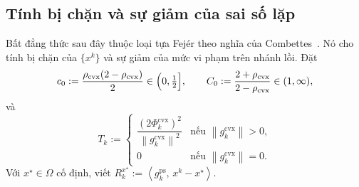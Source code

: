 \documentclass[]{interact}
\theoremstyle{plain}
\theoremstyle{definition}
\theoremstyle{remark}
\newcommand{\norm}[1]{\left\lVert #1 \right\rVert}
\newcommand{\inner}[2]{\left\langle #1,\, #2 \right\rangle}
\newcommand{\cvx}{\mathrm{cvx}}
\newcommand{\ps}{\mathrm{ps}}
\begin{document}
\subsection{Tính bị chặn và sự giảm của sai số lặp}\label{ssec:bounded}
Bất đẳng thức sau đây thuộc loại tựa Fej\'er theo nghĩa của
Combettes~\citep{combettes2001quasifejer}. Nó cho tính bị chặn của $\{x^k\}$ và sự giảm của
mức vi phạm trên nhánh lồi. Đặt
\begin{equation}\label{eq:c0C0}
c_0:=\frac{\rho_{\cvx}(2-\rho_{\cvx})}{2}\in\Bigl(0,\tfrac12\Bigr],\qquad
C_0:=\frac{2+\rho_{\cvx}}{2-\rho_{\cvx}}\in(1,\infty),
\end{equation}
và
\begin{equation}\label{eq:Tk}
T_k:=\begin{cases}\dfrac{(2\Phi^{\cvx}_k)^2}{\norm{g^{\cvx}_k}^2} & \text{nếu }\norm{g^{\cvx}_k}>0,\\ 0 & \text{nếu }\norm{g^{\cvx}_k}=0.\end{cases}
\end{equation}
Với $x^\star\in\Omega$ cố định, viết $R^{x^\star}_k:=\inner{g^{\ps}_k}{x^k-x^\star}$.
\end{document}
